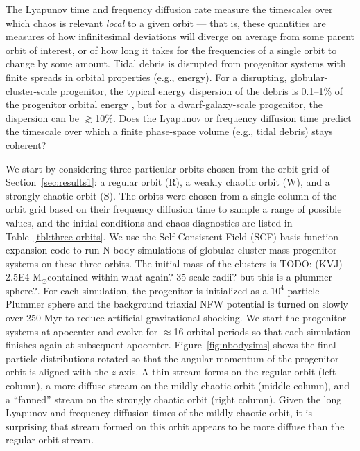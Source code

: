\documentclass[letterpaper,12pt,preprint]{aastex}
\newcommand{\msun}{\ensuremath{\mathrm{M}_\odot}}
\newcommand{\todo}[2]{{\color{red} TODO: (\MakeUppercase{#1}) #2}}
\begin{document}
The Lyapunov time and frequency diffusion rate measure the timescales over which chaos is relevant \emph{local} to a given orbit --- that is, these quantities are measures of how infinitesimal deviations will diverge on average from some parent orbit of interest, or of how long it takes for the frequencies of a single orbit to change by some amount. Tidal debris is disrupted from progenitor systems with finite spreads in orbital properties (e.g., energy). For a disrupting, globular-cluster-scale progenitor, the typical energy dispersion of the debris is 0.1--1\% of the progenitor orbital energy \citep[assuming masses of $10^4$--$10^5$~\msun;][]{johnston98}, but for a dwarf-galaxy-scale progenitor, the dispersion can be $\gtrsim$10\%. Does the Lyapunov or frequency diffusion time predict the timescale over which a finite phase-space volume (e.g., tidal debris) stays coherent?

We start by considering three particular orbits chosen from the orbit grid of Section~\ref{sec:results1}: a regular orbit (R), a weakly chaotic orbit (W), and a strongly chaotic orbit (S). The orbits were chosen from a single column of the orbit grid based on their frequency diffusion time to sample a range of possible values, and the initial conditions and chaos diagnostics are listed in Table~\ref{tbl:three-orbits}. We use the Self-Consistent Field (SCF) basis function expansion code \citep{hernquist92} to run N-body simulations of globular-cluster-mass progenitor systems on these three orbits. The initial mass of the clusters is \todo{kvj}{2.5E4 \msun contained within what again? 35 scale radii? but this is a plummer sphere?}. For each simulation, the progenitor is initialized as a $10^4$ particle Plummer sphere and the background triaxial NFW potential is turned on slowly over 250 Myr to reduce artificial gravitational shocking. We start the progenitor systems at apocenter and evolve for $\approx$16 orbital periods so that each simulation finishes again at subsequent apocenter. Figure~\ref{fig:nbodysims} shows the final particle distributions rotated so that the angular momentum of the progenitor orbit is aligned with the $z$-axis. A thin stream forms on the regular orbit (left column), a more diffuse stream on the mildly chaotic orbit (middle column), and a ``fanned'' stream on the strongly chaotic orbit (right column). Given the long Lyapunov and frequency diffusion times of the mildly chaotic orbit, it is surprising that stream formed on this orbit appears to be more diffuse than the regular orbit stream. 
\end{document}
